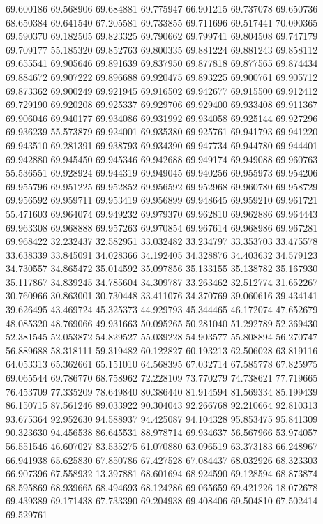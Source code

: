 69.600186
69.568906
69.684881
69.775947
66.901215
69.737078
69.650736
68.650384
69.641540
67.205581
69.733855
69.711696
69.517441
70.090365
69.590370
69.182505
69.823325
69.790662
69.799741
69.804508
69.747179
69.709177
55.185320
69.852763
69.800335
69.881224
69.881243
69.858112
69.655541
69.905646
69.891639
69.837950
69.877818
69.877565
69.874434
69.884672
69.907222
69.896688
69.920475
69.893225
69.900761
69.905712
69.873362
69.900249
69.921945
69.916502
69.942677
69.915500
69.912412
69.729190
69.920208
69.925337
69.929706
69.929400
69.933408
69.911367
69.906046
69.940177
69.934086
69.931992
69.934058
69.925144
69.927296
69.936239
55.573879
69.924001
69.935380
69.925761
69.941793
69.941220
69.943510
69.281391
69.938793
69.934390
69.947734
69.944780
69.944401
69.942880
69.945450
69.945346
69.942688
69.949174
69.949088
69.960763
55.536551
69.928924
69.944319
69.949045
69.940256
69.955973
69.954206
69.955796
69.951225
69.952852
69.956592
69.952968
69.960780
69.958729
69.956592
69.959711
69.953419
69.956899
69.948645
69.959210
69.961721
55.471603
69.964074
69.949232
69.979370
69.962810
69.962886
69.964443
69.963308
69.968888
69.957263
69.970854
69.967614
69.968986
69.967281
69.968422
32.232437
32.582951
33.032482
33.234797
33.353703
33.475578
33.638339
33.845091
34.028366
34.192405
34.328876
34.403632
34.579123
34.730557
34.865472
35.014592
35.097856
35.133155
35.138782
35.167930
35.117867
34.839245
34.785604
34.309787
33.263462
32.512774
31.652267
30.760966
30.863001
30.730448
33.411076
34.370769
39.060616
39.434141
39.626495
43.469724
45.325373
44.929793
45.344465
46.172074
47.652679
48.085320
48.769066
49.931663
50.095265
50.281040
51.292789
52.369430
52.381545
52.053872
54.829527
55.039228
54.903577
55.808894
56.270747
56.889688
58.318111
59.319482
60.122827
60.193213
62.506028
63.819116
64.053313
65.362661
65.151010
64.568395
67.032714
67.585778
67.825975
69.065544
69.786770
68.758962
72.228109
73.770279
74.738621
77.719665
76.453709
77.335209
78.649840
80.386440
81.914594
81.569334
85.199439
86.150715
87.561246
89.033922
90.304043
92.266768
92.210664
92.810313
93.675364
92.952630
94.588937
94.425087
94.104328
95.853475
95.841309
90.323630
94.456538
86.645531
88.978714
69.934637
56.567966
53.974057
56.551546
46.607027
83.535275
61.070880
63.096519
63.373183
66.248967
66.941938
65.625830
67.850786
67.427528
67.084437
68.032926
68.323303
66.907396
67.558932
13.397881
68.601694
68.924590
69.128594
68.873874
68.595869
68.939665
68.494693
68.124286
69.065659
69.421226
18.072678
69.439389
69.171438
67.733390
69.204938
69.408406
69.504810
67.502414
69.529761

